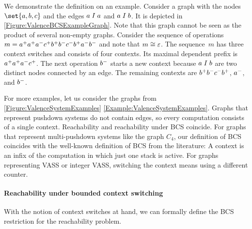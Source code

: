 \documentclass[../../diss.tex]{subfiles}
\begin{document}
We demonstrate the definition on an example.
Consider a graph with the nodes $\set{a, b, c}$ and the edges $a \mathrel{I} a$ and $a \mathrel{I} b$.
It is depicted in \cref{Figure:ValenceBCSExampleGraph}.
Note that this graph cannot be seen as the product of several non-empty graphs.
Consider the sequence of operations $m = {a}^+{a}^+{a}^-{c}^+{b}^+{b}^-{c}^-{b}^+{a}^-{b}^-$ and note that $m \cong \varepsilon$.
The sequence~$m$ has three context switches and consists of four contexts.
Its maximal dependent prefix is ${a}^+{a}^+{a}^-{c}^+$.
The next operation ${b}^-$ starts a new context because $a \mathrel{I} b$ are two distinct nodes connected by an edge.
The remaining contexts are ${b}^+{b}^-{c}^-{b}^+$, ${a}^-$, and ${b}^-$.

For more examples, let us consider the graphs from \cref{Figure:ValenceSystemExamples} \resp \cref{Example:ValenceSystemExamples}.
Graphs that represent pushdown systems do not contain edges, so every computation consists of a single context.
Reachability and reachability under BCS coincide.
For graphs that represent multi-pushdown systems like the graph $C_4$, our definition of BCS coincides with the well-known definition of BCS from the literature: A context is an infix of the computation in which just one stack is active.
For graphs representing VASS or integer VASS, switching the context means using a different counter.

\paragraph{Reachability under bounded context switching}

With the notion of context switches at hand, we can formally define the BCS restriction for the reachability problem.

\begin{problem}
\end{problem}
\end{document}
